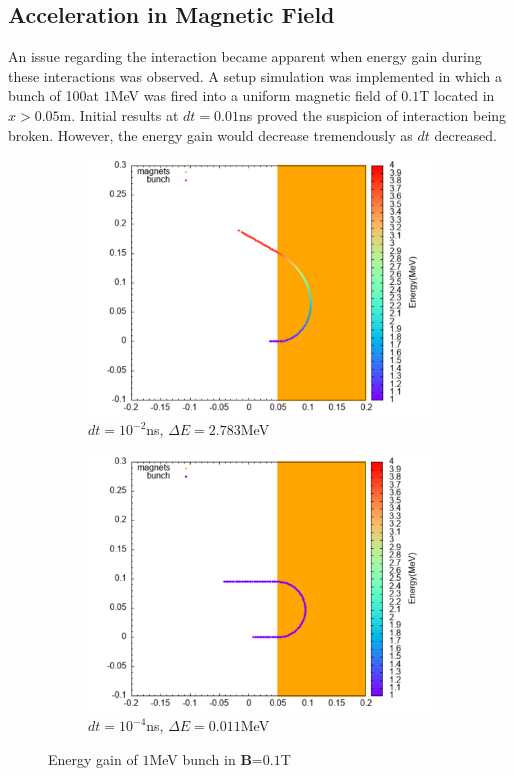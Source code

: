 \documentclass[a4paper,oneside,12pt]{report}
\numberwithin{equation}{chapter}
\begin{document}
\subsection{Acceleration in Magnetic Field}
An issue regarding the \eB interaction became apparent when energy gain during these interactions was observed.
A setup simulation was implemented in which a bunch of 100\e at $1$MeV was fired into a uniform magnetic field of $0.1$T located in $x>0.05$m.
Initial results at $dt=0.01$ns proved the suspicion of \eB interaction being broken. However, the energy gain would decrease tremendously as $dt$ decreased.
\begin{figure}
    \captionsetup[subfigure]{justification=centering}
    \captionsetup{justification=centering}
    \centering
    \begin{subfigure}{0.8\textwidth}
        \centering
        \includegraphics[width=\linewidth]{./figures/rhodoSim/mag_lf_001dt.png}
        \caption*{$dt=10^{-2}$ns, $\Delta E=2.783$MeV}
    \end{subfigure}
    \begin{subfigure}{0.8\textwidth}
        \centering
        \includegraphics[width=\linewidth]{./figures/rhodoSim/mag_lf_00001dt.png}
        \caption*{$dt=10^{-4}$ns, $\Delta E=0.011$MeV}
    \end{subfigure}
    \caption{Energy gain of $1$MeV bunch in \textbf{B}=$0.1$T}
    \label{fig:mag_lf_render}
\end{figure}
\end{document}
